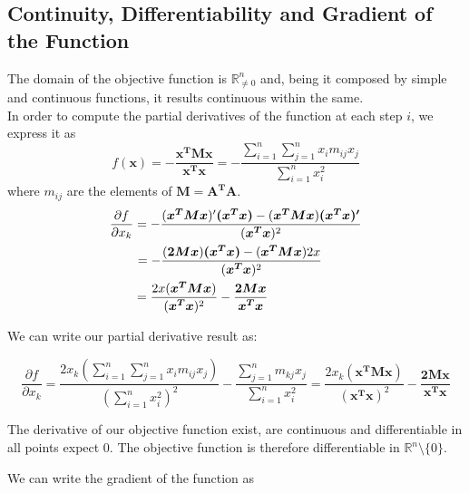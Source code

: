 \documentclass{article}
\numberwithin{equation}{section}
\begin{document}
\subsection{Continuity, Differentiability and Gradient of the Function}
The domain of the objective function is $\mathbb{R}^n_{\not = 0}$ and, being it composed by simple and continuous functions, it results continuous within the same. 
\\

In order to compute the partial derivatives of the function at each step $i$, we express it as
\begin{equation}
    f(\boldsymbol{x})= - \frac{\boldsymbol{x^T M x}}{\boldsymbol{x^Tx}}= -  \frac{\sum_{i=1}^n \sum_{j=1}^n x_i m_{ij} x_j}{\sum_{i=1}^n x^2_i}
\end{equation}
where $m_{ij}$ are the elements of $\boldsymbol{M=A^TA}$.
\\
\begin{equation*}
\begin{aligned}
    \displaystyle \frac{\partial f}{\partial x_k}= - \frac{(\boldsymbol{x^T M x})'\boldsymbol{(x^Tx)}-(\boldsymbol{x^T M x})\boldsymbol{(x^Tx)'} }{(\boldsymbol{x^Tx})^2} \\ = -\frac{(\boldsymbol{2Mx})\boldsymbol{(x^Tx)} - (\boldsymbol{x^T M x})2x }{(\boldsymbol{x^Tx})^2} \hspace{1.1cm} \\ =\frac{2x(\boldsymbol{x^T M x})}{(\boldsymbol{x^Tx})^2}-\frac{ \boldsymbol{2Mx}}{ \boldsymbol{x^Tx}}\hspace{2.6cm}  
\end{aligned}
\end{equation*}

We can write our partial derivative result as:

\begin{equation}
    \displaystyle \frac{\partial f}{\partial x_k}=\frac{2x_k (\sum_{i=1}^n \sum_{j=1}^n x_i m_{ij}x_j)}{(\sum_{i=1}^n x_i^2)^2} - \frac{ \sum_{j=1}^n  m_{kj}x_j}{ \sum_{i=1}^n x_i^2} = \frac{2x_k(\boldsymbol{x^T Mx})}{(\boldsymbol{x^Tx})^2} - \frac{ \boldsymbol{2Mx}}{\boldsymbol{x^Tx}}  
\end{equation}

The derivative of our objective function exist, are continuous and differentiable in all points expect 0. The objective function is therefore differentiable in $\mathbb{R}^n \setminus \{0\}$.

We can write the gradient of the function as
\end{document}
